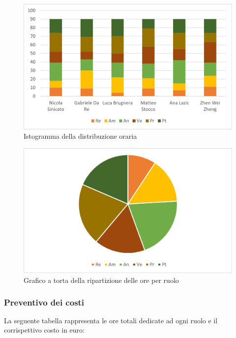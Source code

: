 \begin{figure}[H]
    \centering
    \includegraphics[scale=0.6]{img/grafi preventivo/istogrammi/totale/totale.png}
    \caption{Istogramma della distribuzione oraria}
\end{figure}
\begin{figure}[H]
    \centering
    \includegraphics[scale=0.6]{img/grafi preventivo/torta/totale/totale.png}
    \caption{Grafico a torta della ripartizione delle ore per ruolo}
\end{figure}
\subsubsection{Preventivo dei costi}
La seguente tabella rappresenta le ore totali dedicate ad ogni ruolo e il corrispettivo costo in euro:

